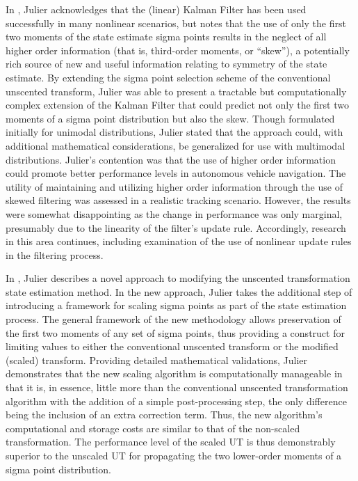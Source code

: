 In \cite{Julier1998}, Julier acknowledges that the (linear) Kalman Filter has been used successfully in many nonlinear scenarios, but notes that the use of only the first two moments of the state estimate sigma points results in the neglect of all higher order information (that is, third-order moments, or ``skew''), a potentially rich source of new and useful information relating to symmetry of the state estimate. By extending the sigma point selection scheme of the conventional unscented transform, Julier was able to present a tractable but computationally complex extension of the Kalman Filter that could predict not only the first two moments of a sigma point distribution but also the skew. Though formulated initially for unimodal distributions, Julier stated that the approach could, with additional mathematical considerations, be generalized for use with multimodal distributions. Julier's contention was that the use of higher order information could promote better performance levels in autonomous vehicle navigation. The utility of maintaining and utilizing higher order information through the use of skewed filtering was assessed in a realistic tracking scenario. However, the results were somewhat disappointing as the change in performance was only marginal, presumably due to the linearity of the filter's update rule. Accordingly, research in this area continues, including examination of the use of nonlinear update rules in the filtering process.

In \cite{Julier2002}, Julier describes a novel approach to modifying the unscented transformation state estimation method. In the new approach, Julier takes the additional step of introducing a framework for scaling sigma points as part of the state estimation process. The general framework of the new methodology allows preservation of the first two moments of any set of sigma points, thus providing a construct for limiting values to either the conventional unscented transform or the modified (scaled) transform. Providing detailed mathematical validations, Julier demonstrates that the new scaling algorithm is computationally manageable in that it is, in essence, little more than the conventional unscented transformation algorithm with the addition of a simple post-processing step, the only difference being the inclusion of an extra correction term. Thus, the new algorithm's computational and storage costs are similar to that of the non-scaled transformation. The performance level of the scaled UT is thus demonstrably superior to the unscaled UT for propagating the two lower-order moments of a sigma point distribution.

